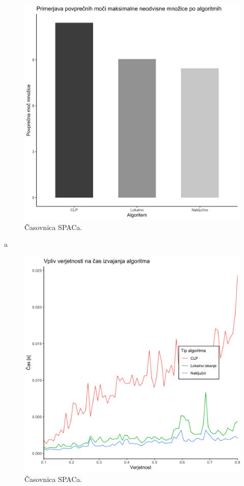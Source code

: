\documentclass[a4paper, 12pt]{article}
\begin{document}
\vspace{0.5cm}
\begin{figure}[h!]
	\begin{center}
		\includegraphics[width=\textwidth]{R_koda/pon-povpmoc.png}
		\caption{Časovnica SPACa.}
	\end{center}
\end{figure}
a
\begin{figure}[h!]
	\begin{center}
		\includegraphics[width=\textwidth]{R_koda/ver-cas.png}
		\caption{Časovnica SPACa.}
	\end{center}
\end{figure}
\end{document}
